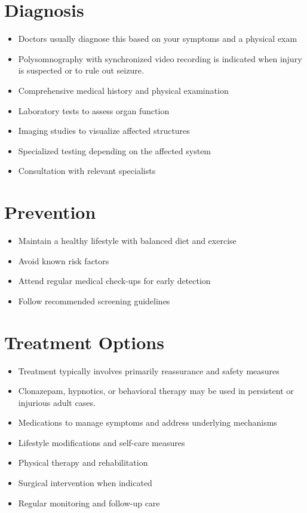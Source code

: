 \section{Diagnosis}
\begin{itemize}[noitemsep]
  \item Doctors usually diagnose this based on your symptoms and a physical exam
  \item Polysomnography with synchronized video recording is indicated when injury is suspected or to rule out seizure.
  \item Comprehensive medical history and physical examination
  \item Laboratory tests to assess organ function
  \item Imaging studies to visualize affected structures
  \item Specialized testing depending on the affected system
  \item Consultation with relevant specialists
\end{itemize}
\section{Prevention}
\begin{itemize}[noitemsep]
  \item Maintain a healthy lifestyle with balanced diet and exercise
  \item Avoid known risk factors
  \item Attend regular medical check-ups for early detection
  \item Follow recommended screening guidelines
\end{itemize}
\section{Treatment Options}
\begin{itemize}[noitemsep]
  \item Treatment typically involves primarily reassurance and safety measures
  \item Clonazepam, hypnotics, or behavioral therapy may be used in persistent or injurious adult cases.
  \item Medications to manage symptoms and address underlying mechanisms
  \item Lifestyle modifications and self-care measures
  \item Physical therapy and rehabilitation
  \item Surgical intervention when indicated
  \item Regular monitoring and follow-up care
\end{itemize}
